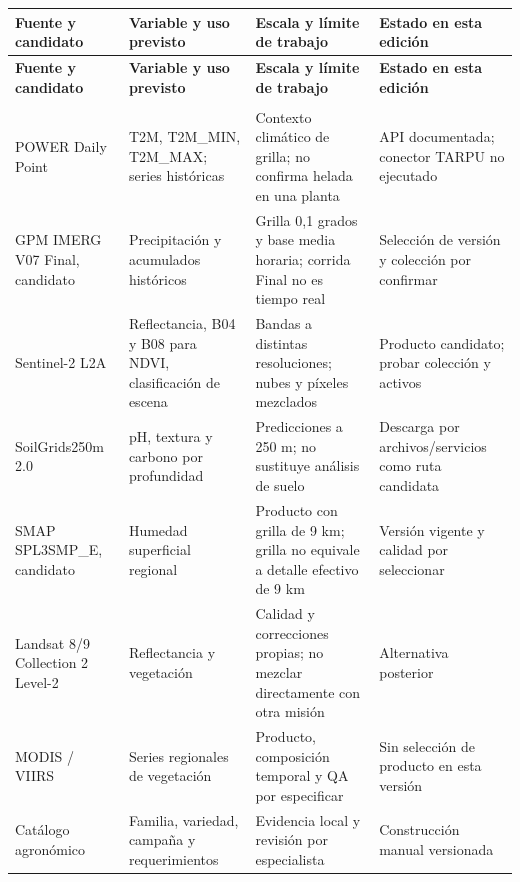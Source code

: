 \documentclass[10pt,a4paper]{article}
\begin{document}
\begingroup\small
\begin{longtable}{>{\raggedright\arraybackslash}p{3.115cm}>{\raggedright\arraybackslash}p{3.582cm}>{\raggedright\arraybackslash}p{4.517cm}>{\raggedright\arraybackslash}p{4.361cm}}
\toprule
\textbf{Fuente y candidato} & \textbf{Variable y uso previsto} & \textbf{Escala y límite de trabajo} & \textbf{Estado en esta edición} \\
\midrule\endfirsthead
\toprule
\textbf{Fuente y candidato} & \textbf{Variable y uso previsto} & \textbf{Escala y límite de trabajo} & \textbf{Estado en esta edición} \\
\midrule\endhead
\midrule\multicolumn{4}{r}{\scriptsize Continúa en la página siguiente}\\\endfoot
\bottomrule\endlastfoot
POWER Daily Point & T2M, T2M\_\allowbreak{}MIN, T2M\_\allowbreak{}MAX; series históricas & Contexto climático de grilla; no confirma helada en una planta & API documentada; conector TARPU no ejecutado \\[3pt]
GPM IMERG V07 Final, candidato & Precipitación y acumulados históricos & Grilla 0,1 grados y base media horaria; corrida Final no es tiempo real & Selección de versión y colección por confirmar \\[3pt]
Sentinel-2 L2A & Reflectancia, B04 y B08 para NDVI, clasificación de escena & Bandas a distintas resoluciones; nubes y píxeles mezclados & Producto candidato; probar colección y activos \\[3pt]
SoilGrids250m 2.0 & pH, textura y carbono por profundidad & Predicciones a 250 m; no sustituye análisis de suelo & Descarga por archivos/\allowbreak{}servicios como ruta candidata \\[3pt]
SMAP SPL3SMP\_\allowbreak{}E, candidato & Humedad superficial regional & Producto con grilla de 9 km; grilla no equivale a detalle efectivo de 9 km & Versión vigente y calidad por seleccionar \\[3pt]
Landsat 8/\allowbreak{}9 Collection 2 Level-2 & Reflectancia y vegetación & Calidad y correcciones propias; no mezclar directamente con otra misión & Alternativa posterior \\[3pt]
MODIS /\allowbreak{} VIIRS & Series regionales de vegetación & Producto, composición temporal y QA por especificar & Sin selección de producto en esta versión \\[3pt]
Catálogo agronómico & Familia, variedad, campaña y requerimientos & Evidencia local y revisión por especialista & Construcción manual versionada \\[3pt]
\end{longtable}
\endgroup
\end{document}
